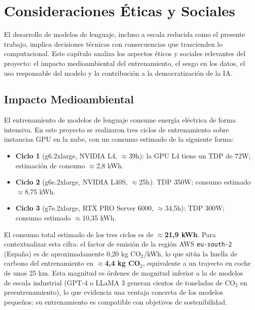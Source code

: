 \section{Consideraciones Éticas y Sociales}
\label{sec:etica}

El desarrollo de modelos de lenguaje, incluso a escala reducida como el presente trabajo, implica decisiones técnicas con consecuencias que trascienden lo computacional. Este capítulo analiza los aspectos éticos y sociales relevantes del proyecto: el impacto medioambiental del entrenamiento, el sesgo en los datos, el uso responsable del modelo y la contribución a la democratización de la IA.

\subsection{Impacto Medioambiental}

El entrenamiento de modelos de lenguaje consume energía eléctrica de forma intensiva. En este proyecto se realizaron tres ciclos de entrenamiento sobre instancias GPU en la nube, con un consumo estimado de la siguiente forma:

\begin{itemize}
    \item \textbf{Ciclo 1} (g6.2xlarge, NVIDIA L4, $\approx$39h): la GPU L4 tiene un TDP de 72W; estimación de consumo $\approx$2,8 kWh.
    \item \textbf{Ciclo 2} (g6e.2xlarge, NVIDIA L40S, $\approx$25h): TDP 350W; consumo estimado $\approx$8,75 kWh.
    \item \textbf{Ciclo 3} (g7e.2xlarge, RTX PRO Server 6000, $\approx$34{,}5h): TDP 300W; consumo estimado $\approx$10,35 kWh.
\end{itemize}

El consumo total estimado de los tres ciclos es de $\approx$\textbf{21,9 kWh}. Para contextualizar esta cifra: el factor de emisión de la región AWS \texttt{eu-south-2} (España) es de aproximadamente 0,20 kg CO$_2$/kWh, lo que sitúa la huella de carbono del entrenamiento en $\approx$\textbf{4,4 kg CO$_2$}, equivalente a un trayecto en coche de unos 25 km. Esta magnitud es órdenes de magnitud inferior a la de modelos de escala industrial (GPT-4 o LLaMA 3 generan cientos de toneladas de CO$_2$ en preentrenamiento), lo que evidencia una ventaja concreta de los modelos pequeños: su entrenamiento es compatible con objetivos de sostenibilidad.

